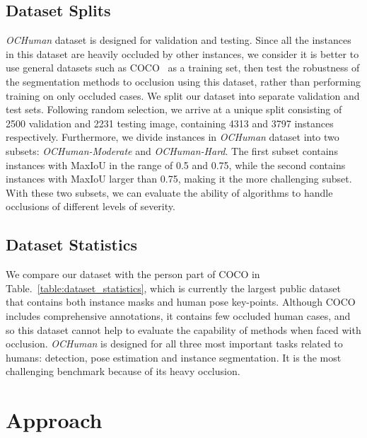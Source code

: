 \documentclass[10pt,twocolumn,letterpaper]{article}
\begin{document}
\subsection{Dataset Splits}
\emph{OCHuman} dataset is designed for validation and testing. Since all the instances in this dataset are heavily occluded by other instances, we consider it is better to use general datasets such as COCO~\cite{lin2014microsoft} as a training set, then test the robustness of the segmentation methods to occlusion using this dataset, rather than performing training on only occluded cases. We split our dataset into separate validation and test sets. Following random selection, we arrive at a unique split consisting of 2500 validation and 2231 testing image, containing 4313 and 3797 instances respectively.
Furthermore, we divide instances in \emph{OCHuman} dataset into two subsets: \emph{OCHuman-Moderate} and \emph{OCHuman-Hard}. The first subset contains instances with MaxIoU in the range of 0.5 and 0.75, while the second contains instances with MaxIoU larger than 0.75, making it the more challenging subset. 
With these two subsets, we can evaluate the ability of algorithms to handle occlusions of different levels of severity. 


\subsection{Dataset Statistics}

We compare our dataset with the person part of COCO in Table.~\ref{table:dataset_statistics}, which is currently the largest public dataset that contains both instance masks and human pose key-points. Although COCO includes comprehensive annotations, it contains few occluded human cases, and so this dataset cannot help to evaluate the capability of methods when faced with occlusion. \emph{OCHuman} is designed for all three most important tasks related to humans: detection, pose estimation and instance segmentation. It is the most challenging benchmark because of its heavy occlusion.








 


\section{Approach}
\end{document}
